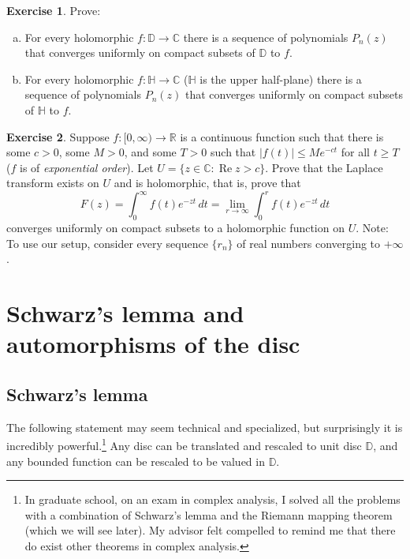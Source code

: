 \documentclass[12pt,openany]{book}
\renewcommand{\Re}{\operatorname{Re}}
\newcommand{\sabs}[1]{\lvert {#1} \rvert}
\newcommand{\C}{{\mathbb{C}}}
\newcommand{\R}{{\mathbb{R}}}
\newcommand{\D}{{\mathbb{D}}}
\newcommand{\bH}{{\mathbb{H}}}
\newcommand{\myindex}[1]{#1\index{#1}}
\theoremstyle{plain}
\theoremstyle{remark}
\theoremstyle{definition}
\newenvironment{exbox}{%
    \def\FrameCommand{\vrule width 1pt \relax\hspace{10pt}}%
    \MakeFramed{\advance\hsize-\width\FrameRestore}%
}{%
    \endMakeFramed
}
\newenvironment{exparts}{%
    \leavevmode\begin{enumerate}[a),noitemsep,topsep=0pt,parsep=0pt,partopsep=0pt]
}{%
    \end{enumerate}
}
\theoremstyle{exercise}
\newtheorem{exercise}{Exercise}[section]
\theoremstyle{example}
\begin{document}
\begin{exbox}
\begin{exercise}\label{exercise:polylimits}
\pagebreak[2]
Prove:
\begin{exparts}
\item
For every holomorphic $f \colon \D \to \C$ there
is a sequence of polynomials $P_n(z)$ that converges uniformly on compact
subsets of $\D$ to $f$.
\item
For every holomorphic $f \colon \bH \to \C$
($\bH$ is the upper half-plane) there
is a sequence of polynomials $P_n(z)$ that converges uniformly on compact
subsets of $\bH$ to $f$.
\end{exparts}
\end{exercise}

\begin{exercise}
\pagebreak[2]
Suppose $f \colon [0,\infty) \to \R$ is a continuous function such that
there is some $c > 0$, some $M > 0$, and some $T > 0$ such that 
$\sabs{f(t)} \leq M e^{-ct}$ for all $t \geq T$
($f$ is of \emph{\myindex{exponential order}}).
Let $U = \{ z \in \C : \Re z > c \}$.  Prove that the Laplace transform
exists on $U$ and is holomorphic, that is, prove that
\begin{equation*}
F(z) = \int_0^\infty f(t) e^{-zt} \, dt = \lim_{r \to \infty} \int_0^r f(t)
e^{-zt} \, dt
\end{equation*}
converges uniformly on compact subsets to a holomorphic function on $U$.
Note: To use our setup, consider every sequence $\{ r_n \}$
of real numbers converging to $+\infty$.
\end{exercise}
\end{exbox}


\section{Schwarz's lemma and automorphisms of the disc}
\label{sec:schwarz}

\subsection{Schwarz's lemma}

The following statement may
seem technical and specialized, but surprisingly it is incredibly
powerful.\footnote{In graduate school, on an exam in complex
analysis, I solved all the problems with a combination of
Schwarz's lemma and the Riemann
mapping theorem (which we will see later).
My advisor
felt compelled to remind me that there do exist other theorems in complex
analysis.}
Any disc can be translated and rescaled to unit disc $\D$, and any
bounded function can be rescaled to be valued in $\D$.
\end{document}
